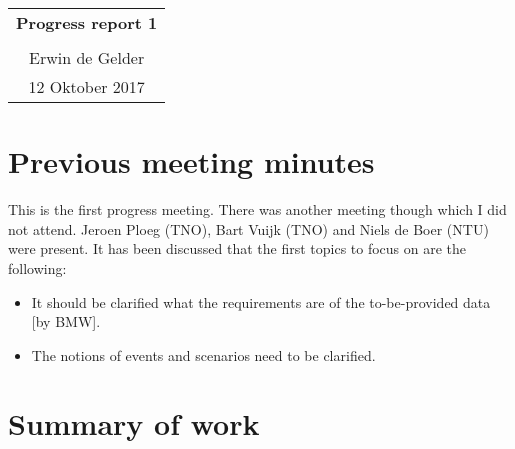 \documentclass[10pt,final,a4paper,oneside,onecolumn]{article}
\newcommand{\progressreportnumber}{1}
\renewcommand{\author}{Erwin de Gelder}
\renewcommand{\date}{12 Oktober 2017}
\begin{document}
	
\begin{center}
	\begin{tabular}{c}
		\textbf{\huge Progress report \progressreportnumber} \\ \\
		\author \\ 
		\date
	\end{tabular}
\end{center}

\section*{Previous meeting minutes}

This is the first progress meeting. There was another meeting though which I did not attend. Jeroen Ploeg (TNO), Bart Vuijk (TNO) and Niels de Boer (NTU) were present. It has been discussed that the first topics to focus on are the following:
\begin{itemize}
	\item It should be clarified what the requirements are of the to-be-provided data [by BMW].
	\item The notions of events and scenarios need to be clarified.
\end{itemize}

\section*{Summary of work}
\end{document}
